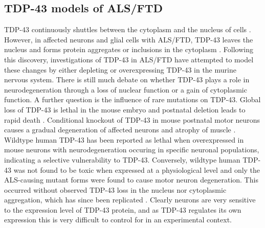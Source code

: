 



\subsection{TDP-43 models of ALS/FTD }

TDP-43 continuously shuttles between the cytoplasm and the nucleus of cells \citep{Ayala2008}. However, in affected neurons and glial cells with ALS/FTD, TDP-43 leaves the nucleus and forms protein aggregates or inclusions in the cytoplasm \citep{Neumann2006-re}. Following this discovery, investigations of TDP-43 in ALS/FTD have attempted to model these changes by either depleting or overexpressing TDP-43 in the murine nervous system. There is still much debate on whether TDP-43 plays a role in neurodegeneration through a loss of nuclear function or a gain of cytoplasmic function.  A further question is the influence of rare mutations on TDP-43.
Global loss of TDP-43 is lethal in the mouse embryo \citep{Kraemer2010} and postnatal deletion leads to rapid death \citep{Chiang2010}. Conditional knockout of TDP-43 in mouse postnatal motor neurons causes a gradual degeneration of affected neurons and atrophy of muscle \citep{Iguchi2013}. Wildtype human TDP-43 has been reported as lethal when overexpressed in mouse neurons \citep{Shan2010,Wegorzewska2009} with neurodegeneration occuring in specific neuronal populations, indicating a selective vulnerability to TDP-43. Conversely, wildtype human TDP-43 was not found to be toxic when expressed at a physiological level \citep{Arnold2013} and only the ALS-causing mutant forms were found to cause motor neuron degeneration. This occurred without observed TDP-43 loss in the nucleus nor cytoplasmic aggregation, which has since been replicated \citep{Igaz2011}. Clearly neurons are very sensitive to the expression level of TDP-43 protein, and as TDP-43 regulates its own expression \citep{Ayala2011,Koyama2016} this is very difficult to control for in an experimental context.

